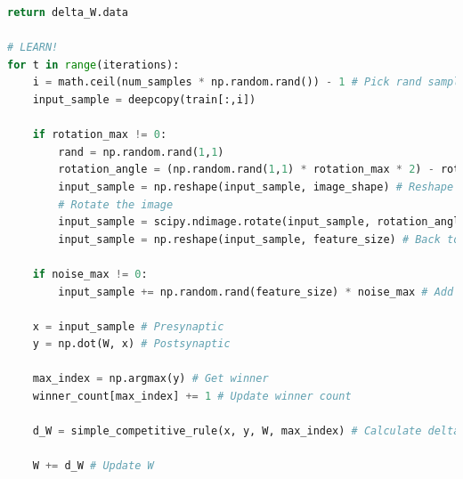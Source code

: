 \documentclass[11pt,journal,transmag,final]{IEEEtran}
\begin{document}
\begin{appendices}
\begin{lstlisting}[language=Python, caption=Competitive Learning Code, basicstyle=\footnotesize, label=code:nn]
    return delta_W.data

# LEARN!
for t in range(iterations):
    i = math.ceil(num_samples * np.random.rand()) - 1 # Pick rand sample
    input_sample = deepcopy(train[:,i])
    
    if rotation_max != 0:
        rand = np.random.rand(1,1)
        rotation_angle = (np.random.rand(1,1) * rotation_max * 2) - rotation_max
        input_sample = np.reshape(input_sample, image_shape) # Reshape to the image
        # Rotate the image
        input_sample = scipy.ndimage.rotate(input_sample, rotation_angle, reshape=False)
        input_sample = np.reshape(input_sample, feature_size) # Back to a flat vector
        
    if noise_max != 0:
        input_sample += np.random.rand(feature_size) * noise_max # Add noise

    x = input_sample # Presynaptic
    y = np.dot(W, x) # Postsynaptic

    max_index = np.argmax(y) # Get winner
    winner_count[max_index] += 1 # Update winner count

    d_W = simple_competitive_rule(x, y, W, max_index) # Calculate delta W

    W += d_W # Update W
        \end{lstlisting}
    \end{appendices}


     
    
\end{document}
